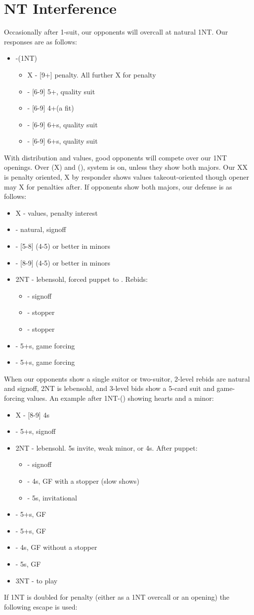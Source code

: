 \documentclass[12pt]{report}
\newcommand{\ul}[1]{\begin{itemize}#1\end{itemize}}
\newcommand{\li}{\item[~]}
\begin{document}
\section{NT Interference} \label{3:4}

    Occasionally after 1-suit, our opponents will overcall at natural 1NT.  Our responses are as follows:

    \ul {
        \li {}-(1NT)
        \ul {
            \li X - [9+] penalty.  All further X for penalty
            \li \cl2 - [6-9] 5+\cl{}, quality suit
            \li \di2 - [6-9] 4+\di (a fit)
            \li \he2 - [6-9] 6+\he{}s, quality suit
            \li \sp2 - [6-9] 6+\sp{}s, quality suit
        }
    }

    With distribution and values, good opponents will compete over our 1NT openings.  Over (X) and (), system is on, unless they show both majors.  Our XX is penalty oriented, X by responder shows values takeout-oriented though opener may X for penalties after.  If opponents show both majors, our defense is as follows:

    \ul {
        \li X - values, penalty interest
        \li {} - natural, signoff
        \li \he2 - [5-8] (4-5) or better in minors
        \li \sp2 - [8-9] (4-5) or better in minors
        \li 2NT - lebensohl, forced puppet to \cl3.  Rebids:
        \ul {
            \li \di3 - signoff
            \li \he3 - stopper
            \li \sp3 - stopper
        }
        \li \cl3 - 5+\cl{}s, game forcing
        \li \di3 - 5+\di{}s, game forcing
    }

    When our opponents show a single suitor or two-suitor, 2-level rebids are natural and signoff, 2NT is lebensohl, and 3-level bids show a 5-card suit and game-forcing values.  An example after 1NT-() showing hearts and a minor:

    \ul {
        \li X - [8-9] 4\sp{}s
        \li {} - 5+\sp{}s, signoff
        \li 2NT - lebensohl.  5\sp{}s invite, weak minor, or 4\sp{}s.  After \cl3 puppet:
        \ul {
            \li \di3 - signoff
            \li \he3 - 4\sp{}s, GF with a stopper (slow shows)
            \li \sp3 - 5\sp{}s, invitational
        }

        \li \cl3 - 5+\cl{}s, GF
        \li \di3 - 5+\di{}s, GF
        \li \he3 - 4\sp{}s, GF without a stopper
        \li \sp3 - 5\sp{}s, GF
        \li 3NT - to play
    }

    If 1NT is doubled for penalty (either as a 1NT overcall or an opening) the following escape is used:
\end{document}
